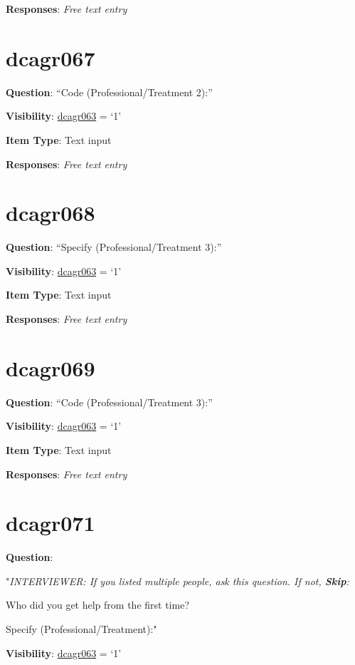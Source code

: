 \documentclass[]{book}
\begin{document}
\textbf{Responses}: \emph{Free text entry}

\hypertarget{dcagr067}{%
\section{dcagr067}\label{dcagr067}}

\textbf{Question}: ``Code (Professional/Treatment 2):''

\textbf{Visibility}: \protect\hyperlink{dcagr063}{dcagr063} = `1'

\textbf{Item Type}: Text input

\textbf{Responses}: \emph{Free text entry}

\hypertarget{dcagr068}{%
\section{dcagr068}\label{dcagr068}}

\textbf{Question}: ``Specify (Professional/Treatment 3):''

\textbf{Visibility}: \protect\hyperlink{dcagr063}{dcagr063} = `1'

\textbf{Item Type}: Text input

\textbf{Responses}: \emph{Free text entry}

\hypertarget{dcagr069}{%
\section{dcagr069}\label{dcagr069}}

\textbf{Question}: ``Code (Professional/Treatment 3):''

\textbf{Visibility}: \protect\hyperlink{dcagr063}{dcagr063} = `1'

\textbf{Item Type}: Text input

\textbf{Responses}: \emph{Free text entry}

\hypertarget{dcagr071}{%
\section{dcagr071}\label{dcagr071}}

\textbf{Question}:

"\emph{INTERVIEWER: If you listed multiple people, ask this question. If not, \textbf{Skip}:}

Who did you get help from the first time?

Specify (Professional/Treatment):"

\textbf{Visibility}: \protect\hyperlink{dcagr063}{dcagr063} = `1'
\end{document}
